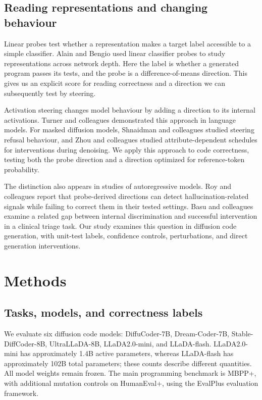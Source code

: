 \documentclass[11pt,letterpaper]{article}
\begin{document}
\subsection{Reading representations and changing behaviour}

Linear probes test whether a representation makes a target label accessible to a simple classifier. Alain and Bengio used linear classifier probes to study representations across network depth.\citep{alain2016} Here the label is whether a generated program passes its tests, and the probe is a difference-of-means direction. This gives us an explicit score for reading correctness and a direction we can subsequently test by steering.

Activation steering changes model behaviour by adding a direction to its internal activations. Turner and colleagues demonstrated this approach in language models.\citep{turner2023} For masked diffusion models, Shnaidman and colleagues studied steering refusal behaviour,\citep{shnaidman2026} and Zhou and colleagues studied attribute-dependent schedules for interventions during denoising.\citep{zhou2026} We apply this approach to code correctness, testing both the probe direction and a direction optimized for reference-token probability.

The distinction also appears in studies of autoregressive models. Roy and colleagues report that probe-derived directions can detect hallucination-related signals while failing to correct them in their tested settings.\citep{roy2026} Basu and colleagues examine a related gap between internal discrimination and successful intervention in a clinical triage task.\citep{basu2026} Our study examines this question in diffusion code generation, with unit-test labels, confidence controls, perturbations, and direct generation interventions.

\section{Methods}\label{sec:methodology}

\subsection{Tasks, models, and correctness labels}

We evaluate six diffusion code models: DiffuCoder-7B, Dream-Coder-7B, Stable-DiffCoder-8B, UltraLLaDA-8B, LLaDA2.0-mini, and LLaDA-flash. LLaDA2.0-mini has approximately 1.4B active parameters, whereas LLaDA-flash has approximately 102B total parameters; these counts describe different quantities. All model weights remain frozen. The main programming benchmark is MBPP+, with additional mutation controls on HumanEval+, using the EvalPlus evaluation framework.\citep{liu2023}
\end{document}
